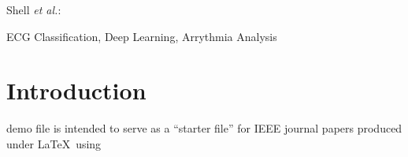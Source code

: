 \documentclass[journal]{IEEEtran}
\begin{document}
%
{Shell \MakeLowercase{\textit{et al.}}: }
% 









\maketitle

\begin{abstract}

\end{abstract}

\begin{IEEEkeywords}
ECG Classification, Deep Learning, Arrythmia Analysis
\end{IEEEkeywords}


%
\IEEEpeerreviewmaketitle



\section{Introduction}


% 
% 
% 
% 
 demo file is intended to serve as a ``starter file''
for IEEE journal papers produced under \LaTeX\ using
\end{document}
